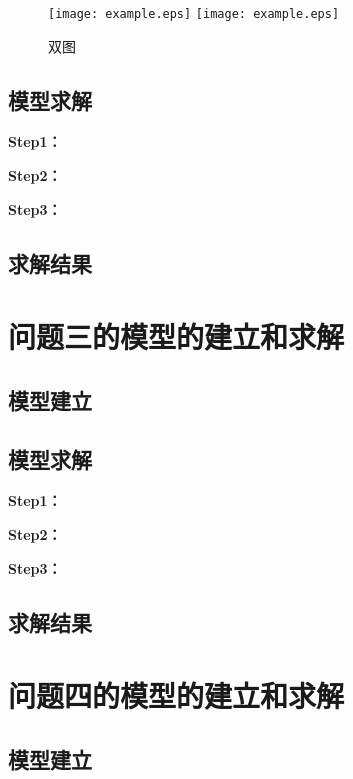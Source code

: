 \documentclass[withoutpreface,bwprint]{cumcmthesis}
\begin{document}
\begin{figure}[ht]
\centering
{}
{\texttt{[image: example.eps]}}
{\texttt{[image: example.eps]}}
\caption{双图}\label{fig:双图}
\end{figure} 

\subsection{模型求解}

\textbf{Step1：} 

\textbf{Step2：} 

\textbf{Step3：} 

\subsection{求解结果}


\section{问题三的模型的建立和求解}
\subsection{模型建立}

\subsection{模型求解}

\textbf{Step1：} 

\textbf{Step2：} 

\textbf{Step3：} 

\subsection{求解结果}


\section{问题四的模型的建立和求解}
\subsection{模型建立}
\end{document}
